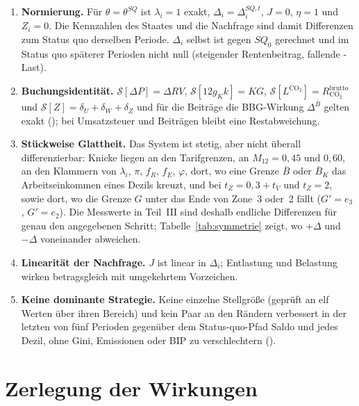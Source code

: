\begin{enumerate}[label=(E\arabic*)]
\item \textbf{Normierung.} Für $\theta=\theta^{SQ}$ ist $\lambda_i=1$ exakt,
  $\Delta_i=\Delta^{SQ,t}_i$, $J=0$, $\eta=1$ und $Z_i=0$. Die Kennzahlen des Staates und die
  Nachfrage sind damit Differenzen zum Status quo derselben Periode. $\Delta_i$ selbst ist
  gegen $SQ_0$ gerechnet und im Status quo späterer Perioden nicht null (steigender
  Rentenbeitrag, fallende \COz-Last).
\item \textbf{Buchungsidentität.} $\mathcal S[\Delta P]=\Delta\mathit{RV}$,
  $\mathcal S[12g_Kk]=KG$, $\mathcal S[L^{\text{CO}_2}]=R^{\text{brutto}}_{\text{CO}_2}$ und
  $\mathcal S[Z]=\delta_U+\delta_W+\delta_Z$ und für die Beiträge die BBG-Wirkung
  $\Delta^{\bar B}$ gelten exakt (); bei
  Umsatzsteuer und Beiträgen bleibt eine Restabweichung.
\item \textbf{Stückweise Glattheit.} Das System ist stetig, aber nicht überall
  differenzierbar: Knicke liegen an den Tarifgrenzen, an $M_{12}=0{,}45$ und $0{,}60$, an den
  Klammern von $\lambda_i$, $\pi$, $f_R$, $f_E$, $\varphi$, dort, wo eine Grenze $\bar B$ oder
  $\bar B_K$ das Arbeitseinkommen eines Dezils kreuzt, und bei
  $t_Z=0{,}3+t_V$ und $t_Z=2$, sowie dort, wo die Grenze $G$ unter das Ende von Zone~3 oder~2
  fällt ($G'=e_3$, $G'=e_2$). Die Messwerte in Teil~III sind deshalb endliche Differenzen für genau den
  angegebenen Schritt; Tabelle~\ref{tab:symmetrie} zeigt, wo $+\Delta$ und $-\Delta$
  voneinander abweichen.
\item \textbf{Linearität der Nachfrage.} $J$ ist linear in $\Delta_i$; Entlastung und
  Belastung wirken betragsgleich mit umgekehrtem Vorzeichen.
\item \textbf{Keine dominante Strategie.} Keine einzelne Stellgröße (geprüft an elf Werten
  über ihren Bereich) und kein Paar an den Rändern verbessert in der letzten von fünf
  Perioden gegenüber dem Status-quo-Pfad Saldo und jedes Dezil, ohne Gini, Emissionen oder
  BIP zu verschlechtern ().
\end{enumerate}

\section{Zerlegung der Wirkungen}
\label{sec:zerlegung}


